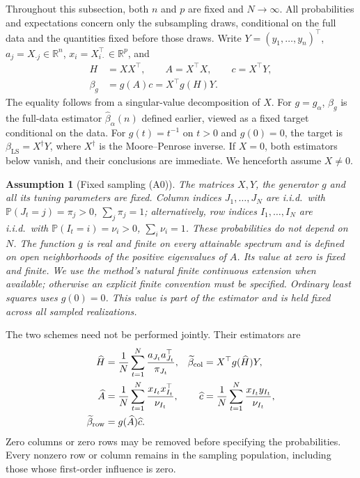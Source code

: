 \documentclass[pdflatex,iicol,sn-mathphys-ay]{sn-jnl}
\theoremstyle{thmstyleone}
\theoremstyle{thmstylethree}
\newtheorem{assumption}{Assumption}
\theoremstyle{thmstyletwo}
\newcommand{\RR}{\mathbb{R}}
\newcommand{\Prob}{\mathbb P}
\begin{document}
Throughout this subsection, both $n$ and $p$ are fixed and $N\to\infty$.
All probabilities and expectations concern only the subsampling draws,
conditional on the full data and the quantities fixed before those draws.
Write $Y=(y_1,\ldots,y_n)^\top$, $a_j=X_{\cdot j}\in\RR^n$, $x_i=X_{i\cdot}^{\top}\in\RR^p$, and
\[
 \begin{aligned}
 H&=XX^\top,\qquad A=X^\top X,\qquad c=X^\top Y,\\
 \beta_g&=g(A)c=X^\top g(H)Y.
 \end{aligned}
\]
The equality follows from a singular-value decomposition of $X$. For $g=g_\alpha$, $\beta_g$ is the full-data estimator $\widehat\beta_\alpha(n)$ defined earlier, viewed as a fixed target conditional on the data.
For $g(t)=t^{-1}$ on $t>0$ and $g(0)=0$, the target is
$\beta_{\mathrm{LS}}=X^\dagger Y$, where $X^\dagger$ is the Moore--Penrose inverse.
If $X=0$, both estimators below vanish, and their conclusions are immediate.
We henceforth assume $X\ne0$.

\begin{assumption}[Fixed sampling (A0)]\label{ass:fixed_sampling}
The matrices $X,Y$, the generator $g$ and all its tuning parameters are fixed.
Column indices $J_1,\ldots,J_N$ are i.i.d.\ with
$\Prob(J_t=j)=\pi_j>0$, $\sum_j\pi_j=1$; alternatively, row indices
$I_1,\ldots,I_N$ are i.i.d.\ with
$\Prob(I_t=i)=\nu_i>0$, $\sum_i\nu_i=1$.
These probabilities do not depend on $N$.
The function $g$ is real and finite on every attainable spectrum and is
defined on open neighborhoods of the positive eigenvalues of $A$.
Its value at zero is fixed and finite. We use the method's natural finite
continuous extension when available; otherwise an explicit finite convention
must be specified. Ordinary least squares uses $g(0)=0$. This value is part
of the estimator and is held fixed across all sampled realizations.
\end{assumption}

The two schemes need not be performed jointly. Their estimators are
\begin{align}
 \widehat H&=\frac1N\sum_{t=1}^N\frac{a_{J_t}a_{J_t}^\top}{\pi_{J_t}},
 &\widetilde\beta_{\mathrm{col}}&=X^\top g(\widehat H)Y,
 \label{eq:fixed_column_estimator}\\
 \widehat A&=\frac1N\sum_{t=1}^N\frac{x_{I_t}x_{I_t}^\top}{\nu_{I_t}},
 &\widehat c&=\frac1N\sum_{t=1}^N\frac{x_{I_t}y_{I_t}}{\nu_{I_t}},
 \notag\\
 \widetilde\beta_{\mathrm{row}}&=g(\widehat A)\widehat c.
 \label{eq:fixed_row_estimator}
\end{align}
Zero columns or zero rows may be removed before specifying the probabilities.
Every nonzero row or column remains in the sampling population, including
those whose first-order influence is zero.
\end{document}
